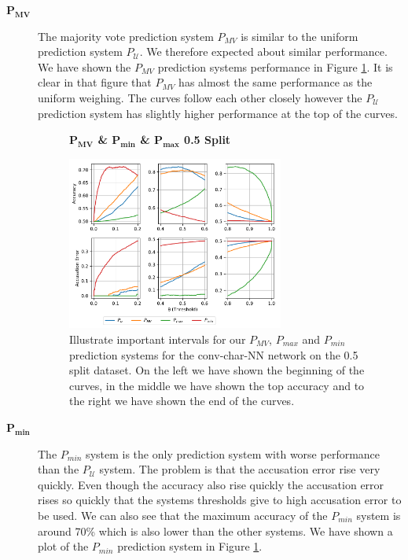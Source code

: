 \begin{description}
    \item[$\mathbf{P_{MV}}$]

        The majority vote prediction system $P_{MV}$ is similar to the uniform
        prediction system $P_{\mathcal{U}}$. We therefore expected about similar
        performance. We have shown the $P_{MV}$ prediction systems performance
        in Figure \ref{fig:conv_char_prediction_zoom_50_majority_vote}. It is
        clear in that figure that $P_{MV}$ has almost the same performance as
        the uniform weighing. The curves follow each other closely however the
        $P_\mathcal{U}$ prediction system has slightly higher performance at the
        top of the curves.

        \begin{figure}
            \centering
            \textbf{$\mathbf{P_{MV}}$ \& $\mathbf{P_{min}}$ \&
            $\mathbf{P_{max}}$ 0.5 Split}\par\medskip
            \includegraphics[width=0.7\textwidth]{./pictures/discussion/conv_char_nn_prediction_zoom_min_max}
            \caption{Illustrate important intervals for our $P_{MV}$, $P_{max}$
                and $P_{min}$ prediction systems for the \gls{conv-char-NN}
                network on the 0.5 split dataset. On the left we have shown the
                beginning of the curves, in the middle we have shown the top
                accuracy and to the right we have shown the end of the curves.}
            \label{fig:conv_char_prediction_zoom_50_majority_vote}
        \end{figure}

    \item[$\mathbf{P_{min}}$]

        The $P_{min}$ system is the only prediction system with worse
        performance than the $P_{\mathcal{U}}$ system. The problem is that
        the accusation error rise very quickly. Even though the accuracy
        also rise quickly the accusation error rises so quickly that the
        systems thresholds give to high accusation error to be used. We
        can also see that the maximum accuracy of the $P_{min}$ system
        is around 70\% which is also lower than the other systems. We
        have shown a plot of the $P_{min}$ prediction system in Figure
        \ref{fig:conv_char_prediction_zoom_50_majority_vote}.


\end{description}

